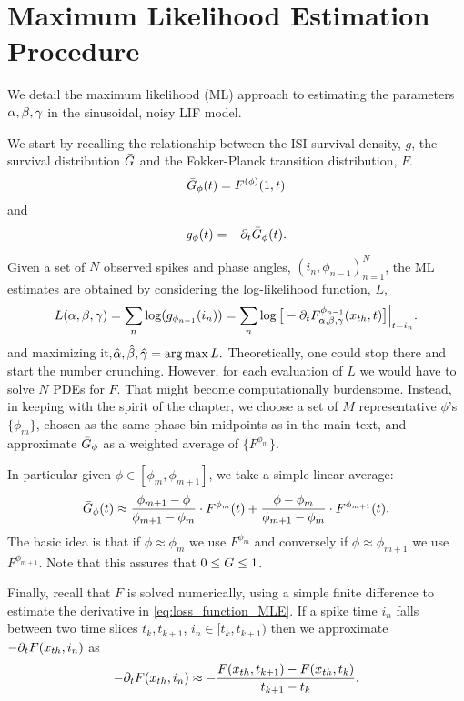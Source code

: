 \section{Maximum Likelihood Estimation Procedure}
We detail the maximum likelihood (ML) approach to estimating the parameters
${\alpha,\beta,{\gamma } }$ in the sinusoidal, noisy LIF model.

We start by recalling the relationship between the ISI survival density, $g$,
the survival distribution ${ \bar{G} }$ and the Fokker-Planck transition distribution,
$F$. $${ \bar{G} }_{\phi}(t) = F^{(\phi)}(1,t)$$ and $$g_{\phi}( t)  = -{\partial}_t
{ \bar{G} }_{\phi}(t). $$

Given a set of $N$ observed spikes and phase angles, $(i_n,
\phi_{n-1})_{n=1}^N$, the ML estimates are obtained by considering the
log-likelihood function, $L$,
\begin{equation}
 L(\alpha,\beta,{\gamma }) = \sum_n  \log (
g_{\phi_{n-1}}(i_n) ) = \sum_n \log \big[ -{\partial}_t F^{\phi_{n-1}}_{\alpha,\beta,{\gamma }}({ x_{th} }, t) \big] \Big|_{t =
i_n}. 
\label{eq:loss_function_MLE}
\end{equation}
and maximizing it,$\abgest = \argmax L.$
Theoretically, one could stop there and start the number crunching. However, for
each evaluation of $L$ we would have to solve $N$ PDEs for $F$. That might
become computationally burdensome. Instead, in keeping with the spirit of the
chapter, we choose a set of $M$ representative $\phi$'s $\{\phi_m\}$, chosen as
the same phase bin midpoints as in the main text, and approximate ${ \bar{G} }_\phi$ as
a weighted average of $\{F^{\phi_m} \}$.



In particular given $\phi \in [\phi_m, \phi_{m+1}]$, we take a simple
linear average:
$${ \bar{G} }_\phi(t) \approx
\frac{\phi_{m+1} - \phi}{\phi_{m+1} - \phi_{m}} \cdot F^{\phi_m}(t)
+ 
\frac{\phi - \phi_{m}}{\phi_{m+1} - \phi_{m}} \cdot F^{\phi_{m+1}}(t).
$$
The basic idea is that if $\phi \approx \phi_m$ we use $F^{\phi_m}$ and
conversely if $\phi \approx \phi_{m+1}$ we use $F^{\phi_{m+1}}$.
Note that this assures that $0 \leq { \bar{G} } \leq 1$.

Finally, recall that $F$ is solved numerically, using a simple finite difference
to estimate the derivative in \cref{eq:loss_function_MLE}. If a spike time $i_n$
falls between two time slices $t_k, t_{k+1}$, $i_n \in [t_k, t_{k+1})$ then we approximate $-{\partial}_t F({ x_{th} }, i_n)$ as $$ -{\partial}_t F({ x_{th} }, i_n)
\approx -\frac{F({ x_{th} }, t_{k+1}) - F({ x_{th} }, t_{k})}{t_{k+1} - t_{k}}. $$


